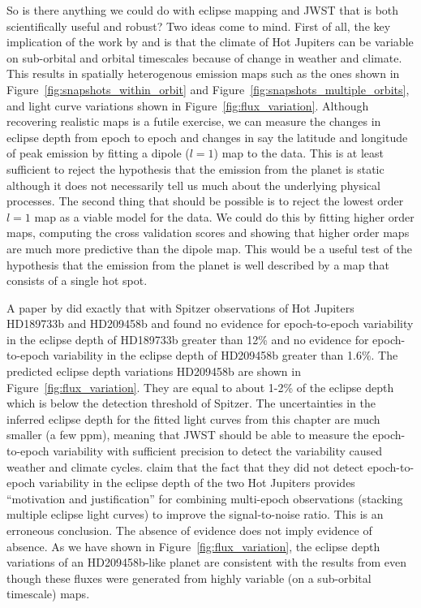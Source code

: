 \documentclass[12pt,dvipsnames]{report}
\begin{document}
So is there anything we could do with eclipse mapping and JWST that is both scientifically useful and 
robust? Two ideas come to mind. First of all, the key implication of the work by 
\citet{2022MNRAS.511.3584S} and \citet{2021ApJ...913L..32C} is that the climate of Hot Jupiters 
can be variable on sub-orbital and orbital timescales because of change in weather and climate.
This results in spatially heterogenous emission maps such as the ones shown in 
Figure~\ref{fig:snapshots_within_orbit} and Figure~\ref{fig:snapshots_multiple_orbits}, and light
curve variations shown in Figure~\ref{fig:flux_variation}. Although recovering realistic maps is a 
futile exercise, we can measure the changes in eclipse depth from epoch to epoch and changes 
in say the latitude and longitude of peak emission by fitting a dipole ($l=1$) map to the data.
This is at least sufficient to reject the hypothesis that the emission from the planet is static
although it does not necessarily tell us much about the underlying physical processes.
The second thing that should be possible is to reject the lowest order $l=1$ map 
as a viable model for the data. We could do this by fitting higher order maps, computing 
the cross validation scores and showing that higher order maps are much more predictive 
than the dipole map. This would be a useful test of the hypothesis that the emission from
the planet is well described by a map that consists of a single hot spot.

A paper by \citet{2020AJ....159...51K} did exactly that with Spitzer observations of Hot Jupiters 
HD189733b and HD209458b and found no evidence for epoch-to-epoch variability in the eclipse depth 
of HD189733b greater than 12\% and no evidence for epoch-to-epoch variability in the eclipse depth
of HD209458b greater than 1.6\%. The predicted eclipse depth variations HD209458b are shown in 
Figure~\ref{fig:flux_variation}. They are equal to about 1-2\% of the eclipse depth which is below the 
detection threshold of Spitzer. The uncertainties in the inferred eclipse depth for the fitted 
light curves from this chapter are much smaller (a few ppm), meaning that JWST should 
be able to measure the epoch-to-epoch variability with sufficient precision to detect the  
variability caused weather and climate cycles. 
\citet{2020AJ....159...51K} claim that the fact 
that they did not detect epoch-to-epoch variability in the eclipse depth of the two Hot Jupiters 
provides ``motivation and justification'' for combining multi-epoch observations (stacking 
multiple eclipse light curves) to improve the signal-to-noise ratio. This is an erroneous conclusion.
The absence of evidence does not imply evidence of absence. As we have shown in 
Figure~\ref{fig:flux_variation}, the eclipse depth variations of an HD209458b-like planet are 
consistent with the results from \citet{2020AJ....159...51K} even though these fluxes were 
generated from highly variable (on a sub-orbital timescale) maps.
\end{document}
